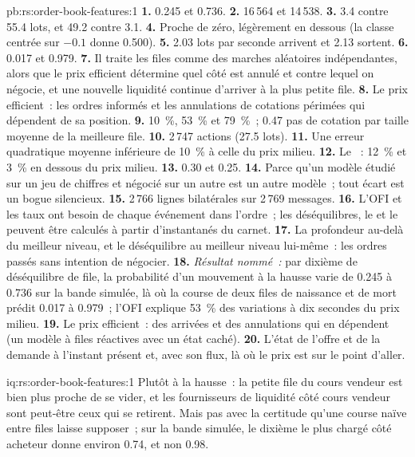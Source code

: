 \begin{solution}{pb:rs:order-book-features:1}
\textbf{1.} 0.245 et 0.736. \textbf{2.} 16\,564 et 14\,538. \textbf{3.} 3.4 contre 55.4 lots, et 49.2 contre 3.1. \textbf{4.} Proche de zéro,
légèrement en dessous (la classe centrée sur $-0.1$ donne 0.500). \textbf{5.} 2.03 lots par seconde arrivent et 2.13 sortent. \textbf{6.} 0.017 et 0.979.
\textbf{7.} Il traite les files comme des marches aléatoires indépendantes, alors que le prix efficient détermine quel côté est annulé et contre lequel on négocie,
et une nouvelle liquidité continue d'arriver à la plus petite file. \textbf{8.} Le prix efficient~: les ordres informés et les annulations de cotations périmées qui
dépendent de sa position. \textbf{9.} 10~\%, 53~\% et 79~\%~; 0.47 pas de cotation par taille moyenne de la meilleure file. \textbf{10.} 2\,747 actions (27.5 lots).
\textbf{11.} Une erreur quadratique moyenne inférieure de 10~\% à celle du prix milieu. \textbf{12.} Le ~: 12~\% et 3~\% en dessous du prix milieu. \textbf{13.} 0.30 et
0.25. \textbf{14.} Parce qu'un modèle étudié sur un jeu de chiffres et négocié sur un autre est un autre modèle~; tout écart est un
bogue silencieux. \textbf{15.} 2\,766 lignes bilatérales sur 2\,769 messages. \textbf{16.} L'OFI et les taux ont besoin de chaque événement dans l'ordre~; les déséquilibres,
le  et le  peuvent être calculés à partir d'instantanés du carnet. \textbf{17.} La profondeur au-delà du meilleur niveau, et le déséquilibre au meilleur niveau lui-même~:
les ordres passés sans intention de négocier. \textbf{18.} \emph{Résultat nommé~:} par dixième de déséquilibre de file, la probabilité d'un mouvement à la hausse varie
de 0.245 à 0.736 sur la bande simulée, là où la course de deux files de naissance et de mort prédit 0.017 à 0.979~; l'OFI explique 53~\% des variations à dix
secondes du prix milieu. \textbf{19.} Le prix efficient~: des arrivées et des annulations qui en dépendent (un modèle à files réactives avec un état caché).
\textbf{20.} L'état de l'offre et de la demande à l'instant présent et, avec son flux, là où le prix est sur le point d'aller.
\end{solution}

\begin{solution}{iq:rs:order-book-features:1}
Plutôt à la hausse~: la petite file du cours vendeur est bien plus proche de se vider, et les fournisseurs de liquidité côté cours vendeur sont peut-être ceux qui se retirent. Mais pas avec
la certitude qu'une course naïve entre files laisse supposer~; sur la bande simulée, le dixième le plus chargé côté acheteur donne environ 0.74, et non 0.98.
\end{solution}

